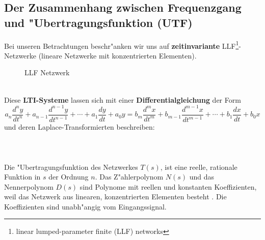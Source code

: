 {\subsection[Zusammenhang Frequenzgang $\leftrightarrow$ UTF]
{Der Zusammenhang zwischen Frequenzgang und "Ubertragungsfunktion
  (UTF)} Bei unseren Betrachtungen beschr"anken wir uns auf {\bf
  zeitinvariante} LLF\footnote{linear
  lumped-parameter finite (LLF) networks}-Netzwerke
(lineare Netzwerke mit konzentrierten
Elementen).\\
\begin{figure}[!htb]
\begin{center}
  \vspace*{-2mm}\caption{LLF Netzwerk}
\end{center}
\vspace*{-6mm}
\end{figure}\\
Diese {\bf LTI-Systeme} lassen sich mit einer {\bf Differentialgleichung} der Form
\begin{equation*}
a_{n}\frac{d^{n} y}{dt^{n}} + a_{n-1}\frac{d^{n-1} y}{dt^{n-1}} + \cdots +
a_{1}\frac{d y}{dt} + a_{0} y=
b_{m}\frac{d^{m} x}{dt^{m}} + b_{m-1}\frac{d^{m-1} x}{dt^{m-1}} + \cdots +
b_{1}\frac{d x}{dt} + b_{0} x
\end{equation*} 
und deren Laplace-Transformierten beschreiben:\\~\\
 \\~\\
 Die
"Ubertragungsfunktion des Netzwerkes $T(s)$, ist eine reelle,
rationale Funktion in $s$ der
Ordnung $n$.  Das Z"ahlerpolynom $N(s)$ und das
Nennerpolynom $D(s)$ sind Polynome mit reellen
und konstanten Koeffizienten, weil das Netzwerk aus linearen,
konzentrierten Elementen besteht \cite{MOS:89}. Die
Koeffizienten sind unabh"angig vom Eingangssignal.\\
{\bf{}}}
